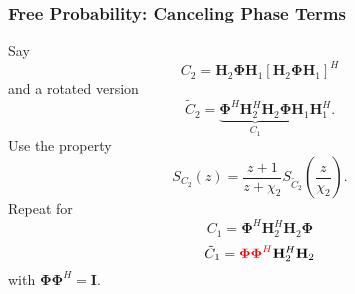 \documentclass[10pt,tgadventor, onlymath]{beamer}
\begin{document}
\begin{frame}
\frametitle{Free Probability: Canceling Phase Terms}
Say 
\begin{equation*}
C_2 = \mathbf{H}_{2}\boldsymbol{\Phi}\mathbf{H}_{1}[\mathbf{H}_{2}\boldsymbol{\Phi}\mathbf{H}_{1}]^H
\end{equation*}
and a rotated version 
\begin{equation*}
\tilde{C}_2 = \underbrace{\boldsymbol{\Phi}^H\mathbf{H}_{2}^H\mathbf{H}_{2}\boldsymbol{\Phi}}_{C_{1}}\mathbf{H}_{1}\mathbf{H}_{1}^H.
\end{equation*}
Use the property 
\begin{equation*}\label{rotation_property}
S_{C_2}(z) = \frac{z+1}{z+\chi_2} S_{\tilde{C}_2}(\frac{z}{\chi_2}).
\end{equation*}
\pause
Repeat for
\begin{equation*}
C_{1} = \boldsymbol{\Phi}^H\mathbf{H}_{2}^H\mathbf{H}_{2}\boldsymbol{\Phi}
\end{equation*}
\begin{equation*}
\tilde{C}_{1} = \textcolor{red}{\boldsymbol{\Phi}\boldsymbol{\Phi}^H}\mathbf{H}_{2}^H\mathbf{H}_{2}
\end{equation*}
with $\boldsymbol{\Phi}\boldsymbol{\Phi}^H = \mathbf{I}$.
\end{frame}
\end{document}
